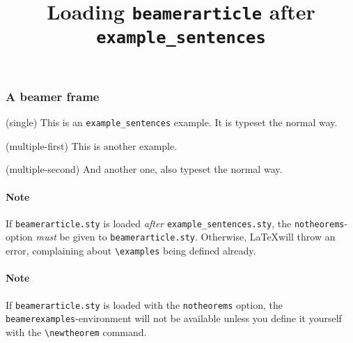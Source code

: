 \documentclass{article}
\title{Loading \texttt{beamerarticle} after \texttt{example\_sentences}}
\date{}
\author{}
\begin{document}
	\maketitle
	\begin{frame}
		\frametitle{A beamer frame}
		\begin{example}
			\item(single) This is an \texttt{example\_sentences} example. It is typeset the normal way.
		\end{example}
		\begin{examples}
		 	 \item(multiple-first) This is another example.
		 	 \item(multiple-second) And another one, also typeset the normal way.
		\end{examples}
	\end{frame}
    
    \paragraph{Note} If \texttt{beamerarticle.sty} is loaded \emph{after} \texttt{example\_sentences.sty}, the \texttt{notheorems}-option \emph{must} be given to \texttt{beamerarticle.sty}. Otherwise, \LaTeX will throw an error, complaining about \verb|\examples| being defined already.

    \paragraph{Note} If \texttt{beamerarticle.sty} is loaded with the \texttt{notheorems} option, the \texttt{beamerexamples}-environment will not be available unless you define it yourself with the
    \verb|\newtheorem| command.
\end{document}
